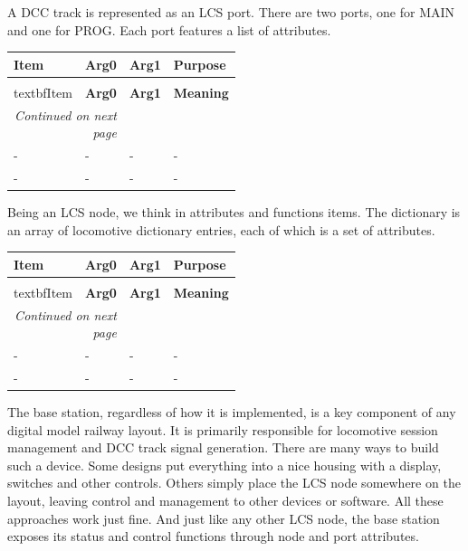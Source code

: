 
A DCC track is represented as an LCS port. There are two ports, one for MAIN and one for PROG. Each port 
features a list of attributes.


\begin{longtable}{@{}|l|l|l|p{0.5\linewidth}|@{}}
    \toprule
    \textbf{Item} & \textbf{Arg0} & \textbf{Arg1} & \textbf{Purpose} \\
    \midrule
    \endfirsthead
    \toprule
    \\textbf{Item} & \textbf{Arg0} & \textbf{Arg1} & \textbf{Meaning} \\
    \midrule
    \endhead
    \midrule
    \multicolumn{2}{r}{\textit{Continued on next page}} \\
    \midrule
    \endfoot
    \bottomrule
    \endlastfoot
    - & - & - & - \\
    \midrule
    - & - & - & - \\
\end{longtable}



Being an LCS node, we think in attributes and functions items. The dictionary is an array of 
locomotive dictionary entries, each of which is a set of attributes.

\begin{longtable}{@{}|l|l|l|p{0.5\linewidth}|@{}}
    \toprule
    \textbf{Item} & \textbf{Arg0} & \textbf{Arg1} & \textbf{Purpose} \\
    \midrule
    \endfirsthead
    \toprule
    \\textbf{Item} & \textbf{Arg0} & \textbf{Arg1} & \textbf{Meaning} \\
    \midrule
    \endhead
    \midrule
    \multicolumn{2}{r}{\textit{Continued on next page}} \\
    \midrule
    \endfoot
    \bottomrule
    \endlastfoot
    - & - & - & - \\
    \midrule
    - & - & - & - \\
\end{longtable}


The base station, regardless of how it is implemented, is a key component of any digital model railway layout. It is primarily responsible for locomotive session management and DCC track signal generation. There are many ways to build such a device. Some designs put everything into a nice housing with a display, switches and other controls. Others simply place the LCS node somewhere on the layout, leaving control and management to other devices or software. All these approaches work just fine. And just like any other LCS node, the base station exposes its status and control functions through node and port attributes.

